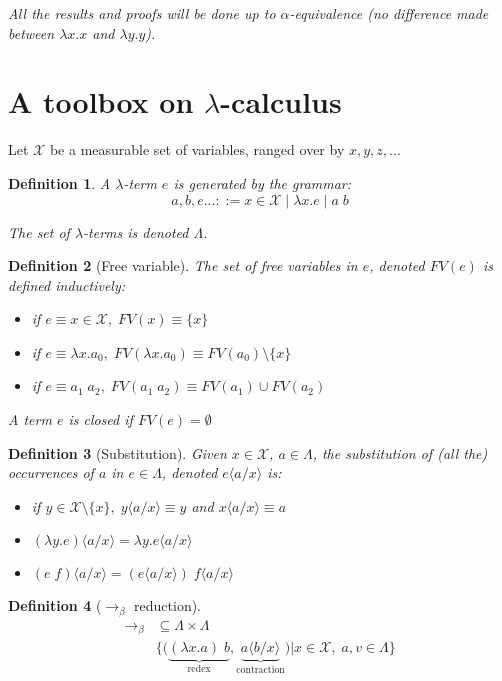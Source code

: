 \documentclass{article}
\newtheorem{defi}{Definition}
\newcommand\subst[2]{\langle #1\big/#2\rangle}
\begin{document}
\emph{All the results and proofs will be done up to  $\alpha$-equivalence (no difference made between $\lambda x.x$ and $\lambda y.y$).}
\section{A toolbox on $\lambda$-calculus}
Let $\mathcal{X}$ be a measurable set of variables, ranged over by $x,y,z,...$

\begin{defi}
A $\lambda$-term $e$ is generated by the grammar:
\[ a,b,e ... ::= x\in \mathcal{X} \;|\; \lambda x.e \; | \; a \; b\]

The set of $\lambda$-terms is denoted $\Lambda$.
\end{defi}


\begin{defi}[Free variable]
The set of free variables in $e$, denoted $FV(e)$ is defined inductively:
\begin{itemize}
\item if $e\equiv x\in \mathcal{X},\; FV(x)\equiv\{x\}$
\item if $e\equiv \lambda x . a_0, \; FV(\lambda x.a_0) \equiv FV(a_0)\setminus \{x\}$
\item if $e\equiv a_1 \; a_2, \; FV(a_1\;a_2)\equiv FV(a_1) \cup FV(a_2)$
\end{itemize}
A term $e$ is \emph{closed} if $FV(e)=\emptyset$
\end{defi}

\begin{defi}[Substitution]
Given $x \in \mathcal{X}$, $a\in \Lambda$, the substitution of (all the) occurrences of $a$ in $e\in \Lambda$, denoted $e\subst{a}{x}$ is:
\begin{itemize}
\item if $y\in \mathcal{X} \setminus \{x\}, \; y\subst{a}{x}\equiv y $ and $x\subst{a}{x}\equiv a$
\item $(\lambda y.e)\subst{a}{x} = \lambda y.e \subst{a}{x}$
\item $(e\; f)\subst{a}{x} = (e\subst{a}{x})\; f\subst{a}{x} $
\end{itemize}
\end{defi}

\begin{defi}[$\to_\beta$ reduction]
\begin{align*}
\to_\beta & \subseteq \Lambda \times \Lambda\\
& \Big\{ \big( \underbrace{(\lambda x.a)\; b}_{\text{redex}},\underbrace{a\subst{b}{x}}_{\text{contraction}}\big)\big| x\in \mathcal{X},\; a,v \in \Lambda \Big\}
\end{align*}
\end{defi}
\end{document}
